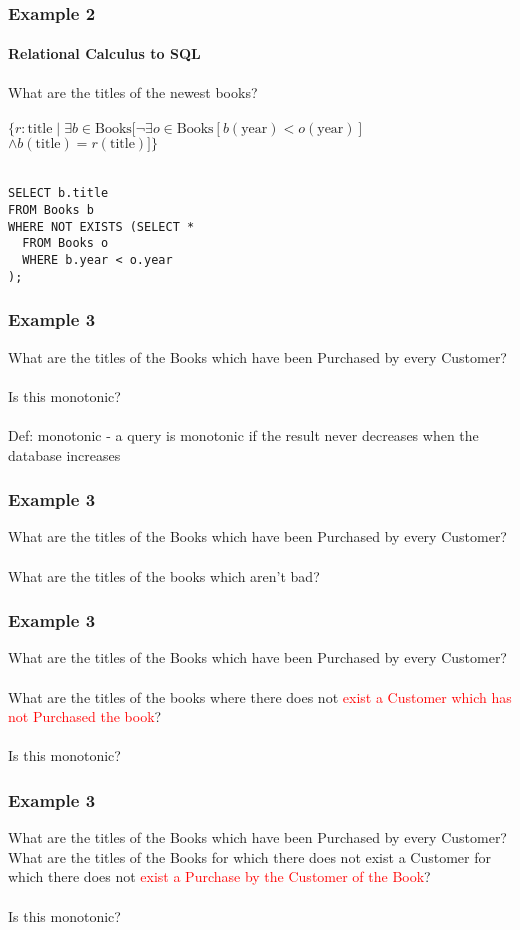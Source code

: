 \documentclass{beamer}
\begin{document}
\begin{frame}[fragile]
  \frametitle{Example 2}
    \framesubtitle{Relational Calculus to SQL}
  What are the titles of the newest books?\\
  \hfill \\
  $\{r:\text{title} \mid \exists b \in \text{Books} [ \neg\exists o \in \text{Books} [ b(\text{year}) < o(\text{year})]$\\
  $\land b(\text{title}) = r(\text{title})] \}$\\
  \hfill \\
\begin{lstlisting}
SELECT b.title
FROM Books b
WHERE NOT EXISTS (SELECT *
  FROM Books o
  WHERE b.year < o.year
);
\end{lstlisting}
\end{frame}

\begin{frame}[fragile]
\frametitle{Example 3}
What are the titles of the Books which have been Purchased by every Customer?\\
\hfill \\
Is this monotonic?\\
\hfill \\
Def: monotonic - a query is monotonic if the result never decreases when the database increases
\end{frame}

\begin{frame}[fragile]
\frametitle{Example 3}
What are the titles of the Books which have been Purchased by every Customer?\\
\hfill \\
What are the titles of the books which aren't bad?
\end{frame}

\begin{frame}[fragile]
\frametitle{Example 3}
What are the titles of the Books which have been Purchased by every Customer?\\
\hfill \\
What are the titles of the books where there does not \textcolor{red}{exist a Customer which has not Purchased the book}?\\
\hfill \\
Is this monotonic?
\end{frame}

\begin{frame}[fragile]
\frametitle{Example 3}
What are the titles of the Books which have been Purchased by every Customer?
\hfill \\
What are the titles of the Books for which there does not exist a Customer for which there does not \textcolor{red}{exist a Purchase by the Customer of the Book}?\\
\hfill \\
Is this monotonic?
\end{frame}
\end{document}
